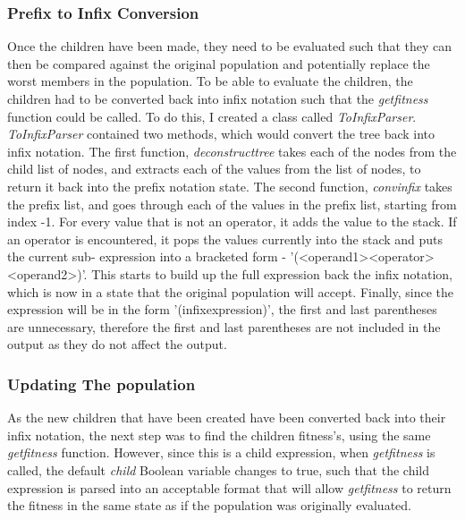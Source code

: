 \documentclass[11pt]{article}
\begin{document}
\subsubsection{Prefix to Infix Conversion}
Once the children have been made, they need to be evaluated such that they can then be compared against the original population and potentially replace the worst members in the population. To be able to evaluate the children, the children had to be converted back into infix notation such that the \textit{get\textunderscore fitness} function could be called. To do this, I created a class called \textit{ToInfixParser}. \\
\textit{ToInfixParser} contained two methods, which would convert the tree back into infix notation. The first function, \textit{deconstruct\textunderscore tree} takes each of the nodes from the child list of nodes, and extracts each of the values from the list of nodes, to return it back into the prefix notation state. The second function, \textit{conv\textunderscore infix} takes the prefix list, and goes through each of the values in the prefix list, starting from index -1. For every value that is not an operator, it adds the value to the stack. If an operator is encountered, it pops the values currently into the stack and puts the current sub- expression into a bracketed form - '(<operand1><operator><operand2>)'. This starts to build up the full expression back the infix notation, which is now in a state that the original population will accept. Finally, since the expression will be in the form '(infixexpression)', the first and last parentheses are unnecessary, therefore the first and last parentheses are not included in the output as they do not affect the output.

\subsubsection{Updating The population}
As the new children that have been created have been converted back into their infix notation, the next step was to find the children fitness's, using the same \textit{get\textunderscore fitness} function. However,  since this is a child expression, when \textit{get\textunderscore fitness} is called, the default \textit{child} Boolean variable changes to true, such that the child expression is parsed into an acceptable format that will allow \textit{get\textunderscore fitness} to return the fitness in the same state as if the population was originally evaluated. \\
\end{document}
